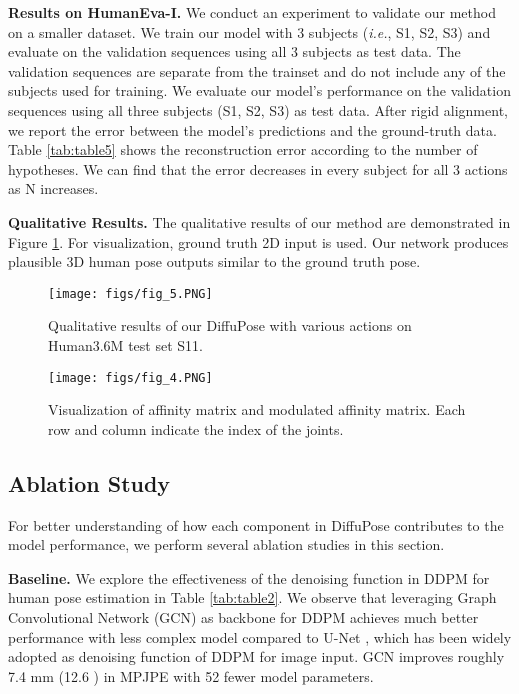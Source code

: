 \documentclass[letterpaper, 10 pt, conference]{ieeeconf}
\begin{document}
\noindent\textbf{Results on HumanEva-I.}
We conduct an experiment to validate our method on a smaller dataset.
We train our model with 3 subjects (\textit{i.e.}, S1, S2, S3) and evaluate on the validation sequences using all 3 subjects as test data.
The validation sequences are separate from the trainset and do not include any of the subjects used for training. We evaluate our model's performance on the validation sequences using all three subjects (S1, S2, S3) as test data. After rigid alignment, we report the error between the model's predictions and the ground-truth data.
Table \ref{tab:table5} shows the reconstruction error according to the number of hypotheses.
We can find that the error decreases in every subject for all 3 actions as N increases.




\noindent\textbf{Qualitative Results.}
The qualitative results of our method are demonstrated in Figure \ref{fig:5}.
For visualization, ground truth 2D input is used.
Our network produces plausible 3D human pose outputs similar to the ground truth pose.

\begin{figure}[t]
    \centering
    \texttt{[image: figs/fig\_5.PNG]}
    \caption{Qualitative results of our DiffuPose with various actions on Human3.6M \cite{ionescu2013human3} test set S11.
    }
    \label{fig:5}
\end{figure}
\begin{figure}[t]
    \centering
    \texttt{[image: figs/fig\_4.PNG]}
    \caption{
    Visualization of affinity matrix and modulated affinity matrix.
    Each row and column indicate the index of the joints.
    }
    \label{fig:4}
    \vspace{-10pt}
\end{figure}


\subsection{Ablation Study}
For better understanding of how each component in DiffuPose contributes to the model performance, we perform several ablation studies in this section.

\noindent\textbf{Baseline.}
We explore the effectiveness of the denoising function in DDPM for human pose estimation in Table \ref{tab:table2}.
We observe that leveraging Graph Convolutional Network (GCN) as backbone for DDPM achieves much better performance with less complex model compared to U-Net \cite{ronneberger2015u}, which has been widely adopted as denoising function of DDPM for image input.
GCN improves roughly 7.4 mm (12.6 ) in MPJPE with 52  fewer model parameters.
\end{document}
